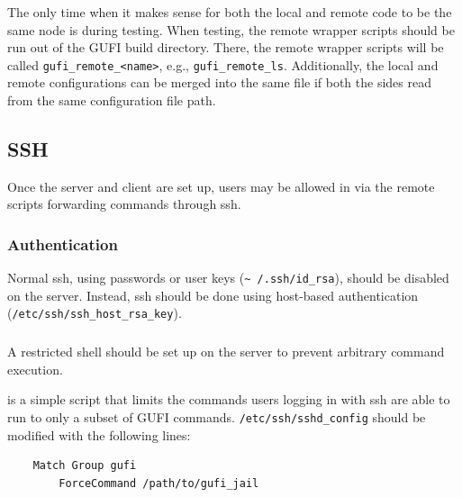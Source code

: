 The only time when it makes sense for both the local and remote code
to be the same node is during testing. When testing, the remote
wrapper scripts should be run out of the GUFI build directory. There,
the remote wrapper scripts will be called
\texttt{gufi\_remote\_<name>}, e.g.,
\texttt{gufi\_remote\_ls}. Additionally, the local and remote
configurations can be merged into the same file if both the sides read
from the same configuration file path.

\subsection{SSH}
Once the server and client are set up, users may be allowed in via the
remote scripts forwarding commands through ssh.

\subsubsection{Authentication}
\label{sec:hostbasedauth}
Normal ssh, using passwords or user keys (\texttt{\textasciitilde
  /.ssh/id\_rsa}), should be disabled on the server. Instead, ssh
should be done using host-based authentication
(\texttt{/etc/ssh/ssh\_host\_rsa\_key}).

\subsubsection{\gufijail}
\label{sec:gufi_jail}
A restricted shell should be set up on the server to prevent arbitrary
command execution.

\gufijail is a simple script that limits the commands users logging in
with ssh are able to run to only a subset of GUFI
commands. \texttt{/etc/ssh/sshd\_config} should be modified with the
following lines:

\begin{verbatim}
    Match Group gufi
        ForceCommand /path/to/gufi_jail
\end{verbatim}
